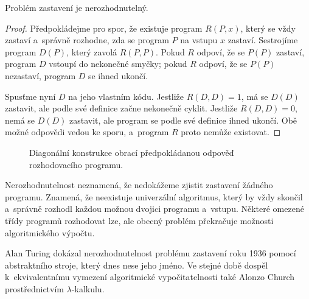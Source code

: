 \begin{theorem}\label{thm:halt-nerozhodnutelny}
    Problém zastavení je nerozhodnutelný.
\end{theorem}

\begin{proof}
    Předpokládejme pro spor, že existuje program \(R(P,x)\), který se vždy zastaví a~správně rozhodne, zda se program \(P\) na vstupu \(x\) zastaví. Sestrojíme program \(D(P)\), který zavolá \(R(P,P)\). Pokud \(R\) odpoví, že se \(P(P)\) zastaví, program \(D\) vstoupí do nekonečné smyčky; pokud \(R\) odpoví, že se \(P(P)\) nezastaví, program \(D\) se ihned ukončí.

    Spusťme nyní \(D\) na jeho vlastním kódu. Jestliže \(R(D,D)=1\), má se \(D(D)\) zastavit, ale podle své definice začne nekonečně cyklit. Jestliže \(R(D,D)=0\), nemá se \(D(D)\) zastavit, ale program se podle své definice ihned ukončí. Obě možné odpovědi vedou ke sporu, a~program \(R\) proto nemůže existovat.
\end{proof}

\begin{figure}[ht]
    \centering
    
    \caption{Diagonální konstrukce obrací předpokládanou odpověď rozhodovacího programu.}
    \label{fig:halt-diagonalizace}
\end{figure}

Nerozhodnutelnost neznamená, že nedokážeme zjistit zastavení žádného programu. Znamená, že neexistuje univerzální algoritmus, který by vždy skončil a~správně rozhodl každou možnou dvojici programu a~vstupu. Některé omezené třídy programů rozhodovat lze, ale obecný problém překračuje možnosti algoritmického výpočtu.

\begin{remark}
    Alan Turing dokázal nerozhodnutelnost problému zastavení roku 1936 pomocí abstraktního stroje, který dnes nese jeho jméno. Ve stejné době dospěl k~ekvivalentnímu vymezení algoritmické vypočitatelnosti také Alonzo Church prostřednictvím \(\lambda\)-kalkulu.
\end{remark}
